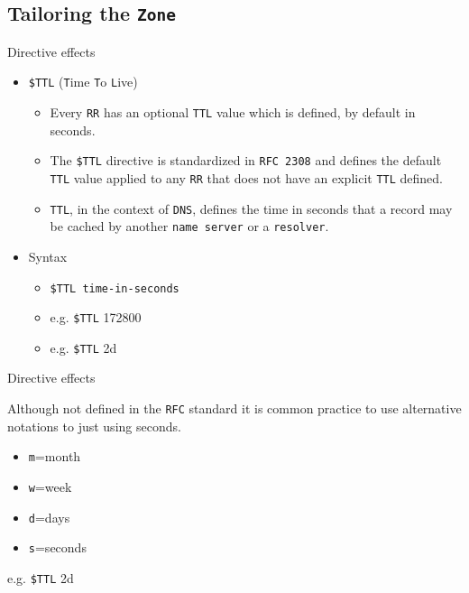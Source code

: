 \documentclass[aspectratio=169,xcolor=table]{beamer}
\begin{document}
\subsection{Tailoring the \texttt{Zone}}
\begin{frame}{Directive effects}
  \begin{itemize}
    \item \texttt{\$TTL} (\texttt{T}ime \texttt{T}o \texttt{L}ive)
       \begin{itemize}
          \item Every \texttt{RR} has an optional \texttt{TTL} value which is defined, by default in seconds.
          \item The \texttt{\$TTL} directive is standardized in \texttt{RFC 2308} and defines the default \texttt{TTL} value applied to any \texttt{RR} that does not have an explicit \texttt{TTL} defined. 
          \item \texttt{TTL}, in the context of \texttt{DNS}, defines the time in seconds that a record may be cached by another \texttt{name server} or a \texttt{resolver}.
       \end{itemize}
    \item Syntax
       \begin{itemize}
          \item \texttt{\$TTL time-in-seconds}
          \item e.g. \texttt{\$TTL} 172800
          \item e.g. \texttt{\$TTL} 2d
       \end{itemize}
  \end{itemize}
\end{frame}

\begin{frame}{Directive effects}
  \begin{tcolorbox}[title={\textbf{NOTE:}}]
    Although not defined in the \texttt{RFC} standard it is common practice to use alternative notations to just using seconds.
    \begin{itemize}
      \item \texttt{m}=month
      \item \texttt{w}=week
      \item \texttt{d}=days
      \item \texttt{s}=seconds
    \end{itemize}
    e.g. \texttt{\$TTL} 2d
  \end{tcolorbox}
\end{frame}
\end{document}
